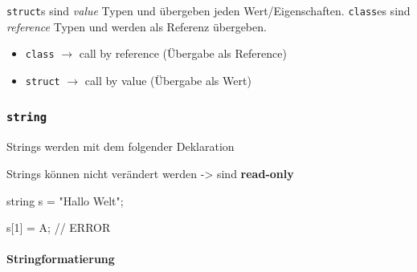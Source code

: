 \documentclass[
  9pt,
  a4paperpaper,
  DIV=11]{scrartcl}
\let\oldparagraph\paragraph
\renewcommand{\paragraph}[1]{\oldparagraph{#1}\mbox{}}
\newenvironment{Shaded}{}{}
\newcommand{\CharTok}[1]{\textcolor[rgb]{0.01,0.18,0.38}{#1}}
\newcommand{\CommentTok}[1]{\textcolor[rgb]{0.42,0.45,0.49}{#1}}
\newcommand{\DataTypeTok}[1]{\textcolor[rgb]{0.84,0.23,0.29}{#1}}
\newcommand{\DecValTok}[1]{\textcolor[rgb]{0.00,0.36,0.77}{#1}}
\newcommand{\NormalTok}[1]{\textcolor[rgb]{0.14,0.16,0.18}{#1}}
\newcommand{\OperatorTok}[1]{\textcolor[rgb]{0.14,0.16,0.18}{#1}}
\newcommand{\StringTok}[1]{\textcolor[rgb]{0.01,0.18,0.38}{#1}}
\providecommand{\tightlist}{%
  \setlength{\itemsep}{0pt}\setlength{\parskip}{0pt}}\usepackage{longtable,booktabs,array}
\numberwithin{equation}{section}
\begin{document}
\begin{multicols}{2}
\begin{tcolorbox}
\texttt{struct}s sind \emph{value} Typen und übergeben jeden
Wert/Eigenschaften. \texttt{class}es sind \emph{reference} Typen und
werden als Referenz übergeben.

\begin{itemize}
\tightlist
\item
  \texttt{class} \(\rightarrow\) call by reference (Übergabe als
  Reference)
\item
  \texttt{struct} \(\rightarrow\) call by value (Übergabe als Wert)
\end{itemize}

\end{tcolorbox}

\hypertarget{string}{%
\subsubsection{\texorpdfstring{\texttt{string}}{string}}\label{string}}

Strings werden mit dem folgender Deklaration

\begin{tcolorbox}[enhanced jigsaw, arc=.35mm, toprule=.15mm, leftrule=.75mm, toptitle=1mm, colbacktitle=quarto-callout-important-color!10!white, title=\textcolor{quarto-callout-important-color}{\faExclamation}\hspace{0.5em}{Wichtig}, opacityback=0, titlerule=0mm, coltitle=black, opacitybacktitle=0.6, bottomtitle=1mm, colback=white, colframe=quarto-callout-important-color-frame, left=2mm, breakable, bottomrule=.15mm, rightrule=.15mm]

Strings können nicht verändert werden -\textgreater{} sind
\textbf{read-only}

\begin{Shaded}
\begin{Highlighting}[]
\DataTypeTok{string}\NormalTok{ s }\OperatorTok{=} \StringTok{"Hallo Welt"}\OperatorTok{;}

\NormalTok{s}\OperatorTok{[}\DecValTok{1}\OperatorTok{]} \OperatorTok{=} \CharTok{\textquotesingle{}A\textquotesingle{}}\OperatorTok{;} \CommentTok{// ERROR}
\end{Highlighting}
\end{Shaded}

\end{tcolorbox}

\hypertarget{stringformatierung}{%
\paragraph{Stringformatierung}\label{stringformatierung}}


\end{multicols}
\end{document}
